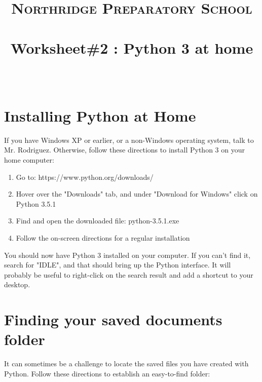 \documentclass[paper=a4, fontsize=11pt]{scrartcl} %
\title{	
\normalfont \normalsize 
\textsc{Northridge Preparatory School} \\ [25pt] %
\horrule{0.5pt} \\[0.4cm] %
\huge Worksheet\#2 : Python 3 at home \\ %
\horrule{2pt} \\[0.5cm] %
}
\author{} %
\date{} %
\numberwithin{equation}{section} %
\numberwithin{figure}{section} %
\numberwithin{table}{section} %
\begin{document}
\maketitle %


\section{Installing Python at Home}

If you have Windows XP or earlier, or a non-Windows operating system, talk to Mr. Rodriguez.  Otherwise, follow these directions to install Python 3 on your home computer:

\begin{enumerate}


\item Go to: https://www.python.org/downloads/

\item Hover over the "Downloads" tab, and under "Download for Windows" click on Python 3.5.1

\item Find and open the downloaded file: python-3.5.1.exe

\item Follow the on-screen directions for a regular installation


\end{enumerate}

You should now have Python 3 installed on your computer.  If you can't find it, search for "IDLE", and that should bring up the Python interface.  It will probably be useful to right-click on the search result and add a shortcut to your desktop.\\





\section{Finding your saved documents folder}

It can sometimes be a challenge to locate the saved files you have created with Python.  Follow these directions to establish an easy-to-find folder:
\end{document}
